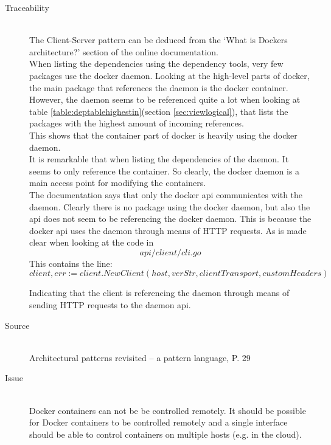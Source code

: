 \begin{description}
\item [Traceability]~\\
The Client-Server pattern can be deduced from the `What is Dockers architecture?' section of the online documentation\cite{dockerarchi}.\\
When listing the dependencies using the dependency tools, very few packages use the docker daemon. Looking at the high-level parts of docker, the main package that references the daemon is the docker container.
However, the daemon seems to be referenced quite a lot when looking at table \ref{table:deptablehighestin}(section \ref{sec:viewlogical}), that lists the packages with the highest amount of incoming references. \\
This shows that the container part of docker is heavily using the docker daemon.\\
It is remarkable that when listing the dependencies of the daemon. It seems to only reference the container. So clearly, the docker daemon is a main access point for modifying the containers.\\
The documentation says that only the docker api communicates with the daemon. Clearly there is no package using the docker daemon, but also the api does not seem to be referencing the docker daemon. This is because the docker api uses the daemon through means of HTTP requests. As is made clear when looking at the code in $$api/client/cli.go$$
This contains the line: 
$$client, err := client.NewClient(host, verStr, clientTransport, customHeaders)$$

Indicating that the client is referencing the daemon through means of sending HTTP requests to the daemon api.


\item [Source]~\\
Architectural patterns revisited -- a pattern language, P. 29 \cite{avgeriou2005architectural}

\item [Issue]~\\
Docker containers can not be be controlled remotely.
It should be possible for Docker containers to be controlled remotely and a single interface should be able to control containers on multiple hosts (e.g. in the cloud).


\end{description}
